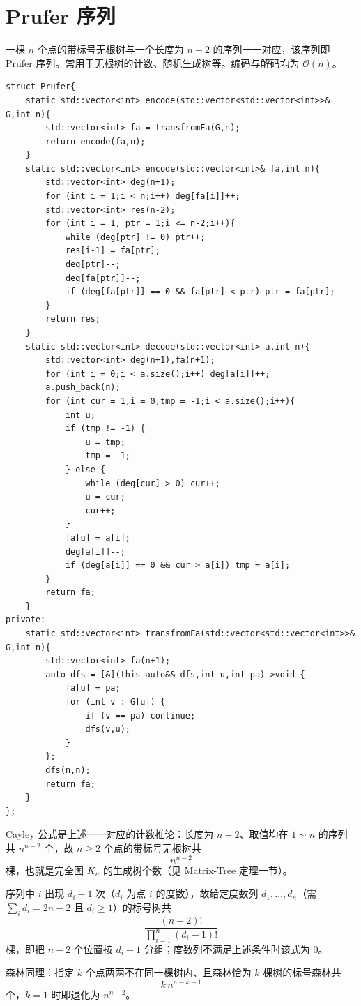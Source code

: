 \section{Prufer 序列}

一棵 $n$ 个点的带标号无根树与一个长度为 $n-2$ 的序列一一对应，该序列即 Prufer 序列。常用于无根树的计数、随机生成树等。编码与解码均为 $\mathcal{O}(n)$。

\begin{lstlisting}
struct Prufer{
    static std::vector<int> encode(std::vector<std::vector<int>>& G,int n){
        std::vector<int> fa = transfromFa(G,n);
        return encode(fa,n);
    }
    static std::vector<int> encode(std::vector<int>& fa,int n){
        std::vector<int> deg(n+1);
        for (int i = 1;i < n;i++) deg[fa[i]]++;
        std::vector<int> res(n-2);
        for (int i = 1, ptr = 1;i <= n-2;i++){
            while (deg[ptr] != 0) ptr++;
            res[i-1] = fa[ptr];
            deg[ptr]--;
            deg[fa[ptr]]--;
            if (deg[fa[ptr]] == 0 && fa[ptr] < ptr) ptr = fa[ptr];
        }
        return res;
    }
    static std::vector<int> decode(std::vector<int> a,int n){
        std::vector<int> deg(n+1),fa(n+1);
        for (int i = 0;i < a.size();i++) deg[a[i]]++;
        a.push_back(n);
        for (int cur = 1,i = 0,tmp = -1;i < a.size();i++){
            int u;
            if (tmp != -1) {
                u = tmp;
                tmp = -1;
            } else {
                while (deg[cur] > 0) cur++;
                u = cur;
                cur++;
            }
            fa[u] = a[i];
            deg[a[i]]--;
            if (deg[a[i]] == 0 && cur > a[i]) tmp = a[i];
        }
        return fa;
    }
private:
    static std::vector<int> transfromFa(std::vector<std::vector<int>>& G,int n){
        std::vector<int> fa(n+1);
        auto dfs = [&](this auto&& dfs,int u,int pa)->void {
            fa[u] = pa;
            for (int v : G[u]) {
                if (v == pa) continue;
                dfs(v,u);
            }
        };
        dfs(n,n);
        return fa;
    }
};
\end{lstlisting}

Cayley 公式是上述一一对应的计数推论：长度为 $n-2$、取值均在 $1\sim n$ 的序列共 $n^{n-2}$ 个，故 $n\ge 2$ 个点的带标号无根树共
\[ n^{n-2} \]
棵，也就是完全图 $K_n$ 的生成树个数（见 Matrix-Tree 定理一节）。

序列中 $i$ 出现 $d_i-1$ 次（$d_i$ 为点 $i$ 的度数），故给定度数列 $d_1,\dots,d_n$（需 $\sum_{i}d_i=2n-2$ 且 $d_i\ge 1$）的标号树共
\[ \frac{(n-2)!}{\prod_{i=1}^{n}(d_i-1)!} \]
棵，即把 $n-2$ 个位置按 $d_i-1$ 分组；度数列不满足上述条件时该式为 $0$。

森林同理：指定 $k$ 个点两两不在同一棵树内、且森林恰为 $k$ 棵树的标号森林共
\[ k\,n^{n-k-1} \]
个，$k=1$ 时即退化为 $n^{n-2}$。


